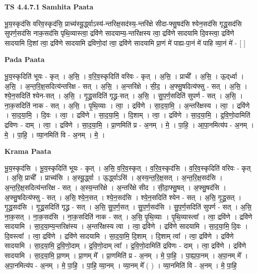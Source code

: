 \documentclass[17pt]{extarticle}
\begin{document}
\textbf{TS 4.4.7.1 } \newline
\textbf{Samhita Paata} \newline

भू॒य॒स्कृद॑सि वरिव॒स्कृद॑सि॒ प्राच्य॑स्यू॒र्द्ध्वाऽस्य॑-न्तरिक्ष॒सद॑स्य॒-न्तरि॑क्षे सीदा-फ्सु॒षद॑सि श्येन॒सद॑सि गृद्ध्र॒सद॑सि सुपर्ण॒सद॑सि नाक॒सद॑सि पृथि॒व्यास्त्वा॒ द्रवि॑णे सादयाम्य॒-न्तरि॑क्षस्य त्वा॒ द्रवि॑णे सादयामि दि॒वस्त्वा॒ द्रवि॑णे सादयामि दि॒शां त्वा॒ द्रवि॑णे सादयामि द्रविणो॒दां त्वा॒ द्रवि॑णे सादयामि प्रा॒णं मे॑ पाह्य-पा॒नं मे॑ पाहि व्या॒नं मे॑ - [  ] \newline

\textbf{Pada Paata} \newline

भू॒य॒स्कृदिति॑ भूयः - कृत् । अ॒सि॒ । व॒रि॒व॒स्कृदिति॑ वरिवः - कृत् । अ॒सि॒ । प्राची᳚ । अ॒सि॒ । ऊ॒द्‌र्ध्वा । अ॒सि॒ । अ॒न्त॒रि॒क्ष॒सदित्य॑न्तरिक्ष - सत् । अ॒सि॒ । अ॒न्तरि॑क्षे । सी॒द॒ । अ॒फ्सु॒षदित्य॑फ्सु - सत् । अ॒सि॒ । श्ये॒न॒सदिति॑ श्येन-सत् । अ॒सि॒ । गृ॒द्ध्र॒सदिति॑ गृद्ध्र-सत् । अ॒सि॒ । सु॒प॒र्ण॒सदिति॑ सुपर्ण - सत् । अ॒सि॒ । ना॒क॒सदिति॑ नाक - सत् । अ॒सि॒ । पृ॒थि॒व्याः । त्वा॒ । द्रवि॑णे । सा॒द॒या॒मि॒ । अ॒न्तरि॑क्षस्य । त्वा॒ । द्रवि॑णे । सा॒द॒या॒मि॒ । दि॒वः । त्वा॒ । द्रवि॑णे । सा॒द॒या॒मि॒ । दि॒शाम् । त्वा॒ । द्रवि॑णे । सा॒द॒या॒मि॒ । द्र॒वि॒णो॒दामिति॑ द्रविणः - दाम् । त्वा॒ । द्रवि॑णे । सा॒द॒या॒मि॒ । प्रा॒णमिति॑ प्र - अ॒नम् । मे॒ । पा॒हि॒ । आ॒पा॒नमित्य॑प - अ॒नम् । मे॒ । पा॒हि॒ । व्या॒नमिति॑ वि - अ॒नम् । मे॒ ।  \newline


\textbf{Krama Paata} \newline

भू॒य॒स्कृद॑सि । भू॒य॒स्कृदिति॑ भूयः - कृत् । अ॒सि॒ व॒रि॒व॒स्कृत् । व॒रि॒व॒स्कृद॑सि । व॒रि॒व॒स्कृदिति॑ वरिवः - कृत् । अ॒सि॒ प्राची᳚ । प्राच्य॑सि । अ॒स्यू॒र्द्ध्वा । ऊ॒र्द्ध्वाऽसि॑ । अ॒स्य॒न्त॒रि॒क्ष॒सत् । अ॒न्त॒रि॒क्ष॒सद॑सि । अ॒न्त॒रि॒क्ष॒सदित्य॑न्तरिक्ष - सत् । अ॒स्य॒न्तरि॑क्षे । अ॒न्तरि॑क्षे सीद । सी॒दा॒फ्सु॒षत् । अ॒फ्सु॒षद॑सि । अ॒फ्सु॒षदित्य॑फ्सु - सत् । अ॒सि॒ श्ये॒न॒सत् । श्ये॒न॒सद॑सि । श्ये॒न॒सदिति॑ श्येन - सत् । अ॒सि॒ गृ॒द्ध्र॒सत् । गृ॒द्ध्र॒सद॑सि । गृ॒द्ध्र॒सदिति॑ गृद्ध्र - सत् । अ॒सि॒ सु॒प॒र्ण॒सत् । सु॒प॒र्ण॒सद॑सि । सु॒प॒र्ण॒सदिति॑ सुपर्ण - सत् । अ॒सि॒ ना॒क॒सत् । ना॒क॒सद॑सि । ना॒क॒सदिति॑ नाक - सत् । अ॒सि॒ पृ॒थि॒व्याः । पृ॒थि॒व्यास्त्वा᳚ । त्वा॒ द्रवि॑णे । द्रवि॑णे सादयामि । सा॒द॒या॒म्य॒न्तरिक्ष॑स्य । अ॒न्तरि॑क्षस्य त्वा । त्वा॒ द्रवि॑णे । द्रवि॑णे सादयामि । सा॒द॒या॒मि॒ दि॒वः । दि॒वस्त्वा᳚ । त्वा॒ द्रवि॑णे । द्रवि॑णे सादयामि । सा॒द॒या॒मि॒ दि॒शाम् । दि॒शाम् त्वा᳚ । त्वा॒ द्रवि॑णे । द्रवि॑णे सादयामि । सा॒द॒या॒मि॒ द्र॒वि॒णो॒दाम् । द्र॒वि॒णो॒दाम् त्वा᳚ । द्र॒वि॒णो॒दामिति॑ द्रविणः - दाम् । त्वा॒ द्रवि॑णे । द्रवि॑णे सादयामि । सा॒द॒या॒मि॒ प्रा॒णम् । प्रा॒णम् मे᳚ । प्रा॒णमिति॑ प्र - अ॒नम् । मे॒ पा॒हि॒ । पा॒ह्य॒पा॒नम् । अ॒पा॒नम् मे᳚ । अ॒पा॒नमित्य॑प - अ॒नम् । मे॒ पा॒हि॒ । पा॒हि॒ व्या॒नम् । व्या॒नम् मे᳚ ( ) । व्या॒नमिति॑ वि - अ॒नम् । मे॒ पा॒हि॒ \newline
\end{document}
